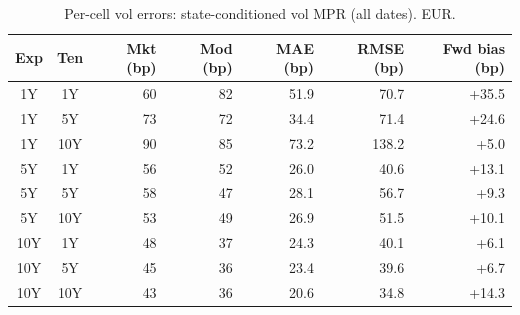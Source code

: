\begin{table}[H]
\centering
\caption{Per-cell vol errors: state-conditioned vol MPR (all dates). EUR.}
\label{tab:state_vol_mpr_per_cell_all}
\small
\begin{tabular}{@{}ccrrrrr@{}}
\toprule
\textbf{Exp} & \textbf{Ten} & \textbf{Mkt (bp)} & \textbf{Mod (bp)} & \textbf{MAE (bp)} & \textbf{RMSE (bp)} & \textbf{Fwd bias (bp)} \\
\midrule
  1Y & 1Y & 60 & 82 & 51.9 & 70.7 & +35.5 \\
  1Y & 5Y & 73 & 72 & 34.4 & 71.4 & +24.6 \\
  1Y & 10Y & 90 & 85 & 73.2 & 138.2 & +5.0 \\
  \midrule
  5Y & 1Y & 56 & 52 & 26.0 & 40.6 & +13.1 \\
  5Y & 5Y & 58 & 47 & 28.1 & 56.7 & +9.3 \\
  5Y & 10Y & 53 & 49 & 26.9 & 51.5 & +10.1 \\
  \midrule
  10Y & 1Y & 48 & 37 & 24.3 & 40.1 & +6.1 \\
  10Y & 5Y & 45 & 36 & 23.4 & 39.6 & +6.7 \\
  10Y & 10Y & 43 & 36 & 20.6 & 34.8 & +14.3 \\
\bottomrule
\end{tabular}
\end{table}
